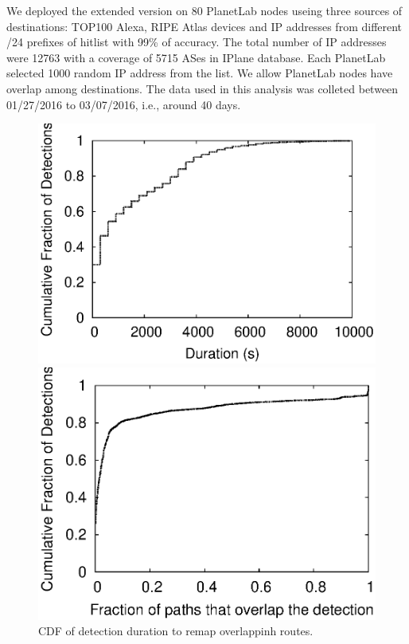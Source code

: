 We deployed the extended \dtrack{} version on 80 PlanetLab nodes useing three 
sources of destinations: TOP100 Alexa,  RIPE Atlas devices and IP addresses from 
different /24 prefixes of  hitlist with 99\% of accuracy. The total number of IP 
addresses were 12763 with a coverage of 5715 ASes in IPlane database. Each PlanetLab selected
1000 random IP address from the list. We allow PlanetLab nodes have overlap
among destinations. The data used in this analysis was colleted between 01/27/2016 
to 03/07/2016, i.e., around 40 days.

\begin{figure}
\vspace{5mm}
\begin{minipage}{0.32\textwidth}
\includegraphics[width=0.8\columnwidth]{figs/patching/durationdetection/durationdetection.eps}
\caption{CDF of detection duration to remap overlappinh routes. }
\label{fig:overlap.delay.cdf}
%
\end{minipage}
\hfill
\begin{minipage}{0.32\textwidth}
\includegraphics[width=0.8\columnwidth]{figs/patching/routesoverlapping/routesoverlapping.eps}

\end{minipage}
\end{figure}
